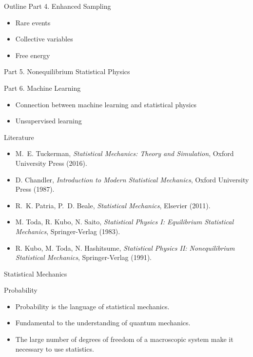 \documentclass[10pt]{beamer}
\begin{document}
\begin{frame}{Outline}
\textcolor{subtitle}{Part 4. Enhanced Sampling}
\begin{itemize}
  \item Rare events
  \item Collective variables
  \item Free energy
\end{itemize}
\vspace{0.5cm}

\textcolor{subtitle}{Part 5. Nonequilibrium Statistical Physics}
\vspace{0.5cm}

\textcolor{subtitle}{Part 6. Machine Learning}
\begin{itemize}
  \item Connection between machine learning and statistical physics
  \item Unsupervised learning
\end{itemize}
\end{frame}

\begin{frame}{Literature}
\begin{itemize}
\setlength\itemsep{1em}
  \item M.~E. Tuckerman, \textit{Statistical Mechanics: Theory and Simulation}, Oxford University Press (2016).
  \item D. Chandler, \textit{Introduction to Modern Statistical Mechanics}, Oxford University Press (1987).
  \item R.~K. Patria, P.~D. Beale, \textit{Statistical Mechanics}, Elsevier (2011).
  \item M. Toda, R. Kubo, N. Saito, \textit{Statistical Physics I: Equilibrium Statistical Mechanics}, Springer-Verlag (1983).
  \item R. Kubo, M. Toda, N. Hashitsume, \textit{Statistical Physics II: Nonequilibrium Statistical Mechanics}, Springer-Verlag (1991).
\end{itemize}
\end{frame}

\begin{frame}{}
  \begin{center}
    \fontsize{25pt}{6}\selectfont\vspace{1.2cm}
    \textcolor{subtitle}{Statistical Mechanics}
  \end{center}
\end{frame}

\begin{frame}{Probability}
\begin{itemize}
\setlength\itemsep{1em}
  \item Probability is the language of statistical mechanics.
  \item Fundamental to the understanding of quantum mechanics.
  \item The large number of degrees of freedom of a macroscopic system make it necessary to use statistics.
\end{itemize}
\end{frame}
\end{document}
